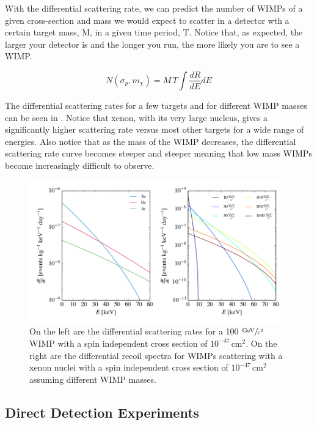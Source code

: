 With the differential scattering rate, we can predict the number of WIMPs of a given cross-section and mass we would expect to scatter in a detector wth a certain target mass, M, in a given time period, T.  Notice that, as expected, the larger your detector is and the longer you run, the more likely you are to see a WIMP.

\begin{equation}
        N(\sigma_p, m_{\chi}) = M \, T \int \frac{dR}{dE} dE
\end{equation}



The differential scattering rates for a few targets and for different WIMP masses can be seen in .  Notice that xenon, with its very large nucleus, gives a significantly higher scattering rate versus most other targets for a wide range of energies.  Also notice that as the mass of the WIMP decreases, the differential scattering rate curve becomes steeper and steeper meaning that low mass WIMPs become increasingly difficult to observe.

\begin{figure}[t]
	\centering
	\includegraphics[width=0.99\textwidth]{wimp_recoil_rates}
	\caption{On the left are the differential scattering rates for a 100 $\sfrac{\textrm{GeV}}{\textrm{c}^2}$ WIMP with a spin independent cross section of $10^{-47} \, \textrm{cm}^2$.  On the right are the differential recoil spectra for WIMPs scattering with a xenon nuclei with a spin independent cross section of $10^{-47} \, \textrm{cm}^2$ assuming different WIMP masses.}
	\label{fig:wimp_scattering_rate}
\end{figure}


\subsection{Direct Detection Experiments}

